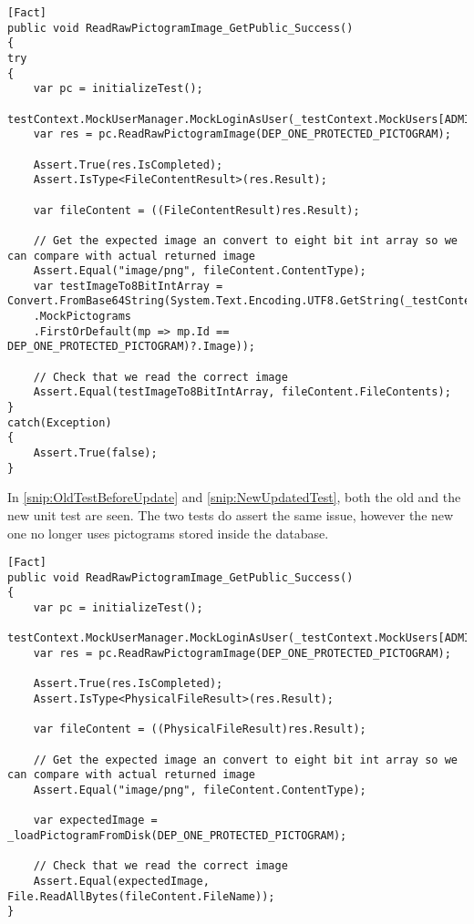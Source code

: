 \begin{lstlisting}[label={snip:OldTestBeforeUpdate}, caption={The old test after images are served from disk}, captionpos=b, language=CSharp] 
[Fact]
public void ReadRawPictogramImage_GetPublic_Success()
{
try
{
    var pc = initializeTest();
    testContext.MockUserManager.MockLoginAsUser(_testContext.MockUsers[ADMIN_DEP_ONE]);
    var res = pc.ReadRawPictogramImage(DEP_ONE_PROTECTED_PICTOGRAM);

    Assert.True(res.IsCompleted);
    Assert.IsType<FileContentResult>(res.Result);

    var fileContent = ((FileContentResult)res.Result);

    // Get the expected image an convert to eight bit int array so we can compare with actual returned image
    Assert.Equal("image/png", fileContent.ContentType);
    var testImageTo8BitIntArray = Convert.FromBase64String(System.Text.Encoding.UTF8.GetString(_testContext
    .MockPictograms
    .FirstOrDefault(mp => mp.Id == DEP_ONE_PROTECTED_PICTOGRAM)?.Image));

    // Check that we read the correct image
    Assert.Equal(testImageTo8BitIntArray, fileContent.FileContents);
}
catch(Exception)
{
    Assert.True(false);
}
\end{lstlisting}

In \autoref{snip:OldTestBeforeUpdate} and \autoref{snip:NewUpdatedTest}, both the old and the new unit test are seen. 
The two tests do assert the same issue, however the new one no longer uses pictograms stored inside the database.

\begin{lstlisting}[label={snip:NewUpdatedTest}, caption={The updated test after images are served from disk}, captionpos=b, language=CSharp] 
[Fact]
public void ReadRawPictogramImage_GetPublic_Success()
{
    var pc = initializeTest();
    testContext.MockUserManager.MockLoginAsUser(_testContext.MockUsers[ADMIN_DEP_ONE]);
    var res = pc.ReadRawPictogramImage(DEP_ONE_PROTECTED_PICTOGRAM);

    Assert.True(res.IsCompleted);
    Assert.IsType<PhysicalFileResult>(res.Result);

    var fileContent = ((PhysicalFileResult)res.Result);

    // Get the expected image an convert to eight bit int array so we can compare with actual returned image
    Assert.Equal("image/png", fileContent.ContentType);
            
    var expectedImage = _loadPictogramFromDisk(DEP_ONE_PROTECTED_PICTOGRAM);

    // Check that we read the correct image
    Assert.Equal(expectedImage, File.ReadAllBytes(fileContent.FileName));      
}
\end{lstlisting}

